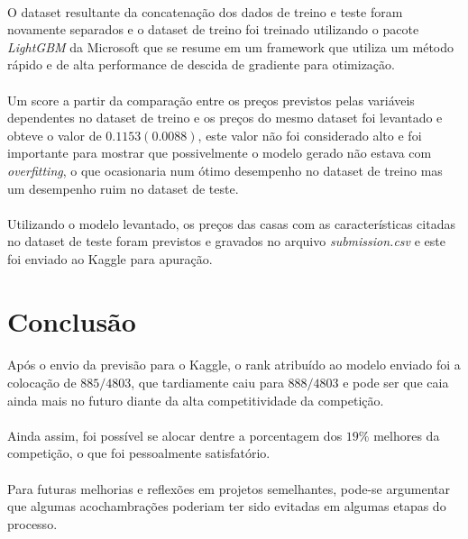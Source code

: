 \documentclass{article}
\begin{document}
	\paragraph{}O dataset resultante da concatenação dos dados de treino e teste foram novamente separados e o dataset de treino foi treinado utilizando o pacote \textit{LightGBM} da Microsoft que se resume em um framework que utiliza um método rápido e de alta performance de descida de gradiente para otimização.
	
	\paragraph{}Um score a partir da comparação entre os preços previstos pelas variáveis dependentes no dataset de treino e os preços do mesmo dataset foi levantado e obteve o valor de $0.1153 (0.0088)$, este valor não foi considerado alto e foi importante para mostrar que possivelmente o modelo gerado não estava com \textit{overfitting}, o que ocasionaria num ótimo desempenho no dataset de treino mas um desempenho ruim no dataset de teste.
	
	\paragraph{}Utilizando o modelo levantado, os preços das casas com as características citadas no dataset de teste foram previstos e gravados no arquivo \textit{submission.csv} e este foi enviado ao Kaggle para apuração.
\section{Conclusão}

	\paragraph{}Após o envio da previsão para o Kaggle, o rank atribuído ao modelo enviado foi a colocação de $885/4803$, que tardiamente caiu para $888/4803$ e pode ser que caia ainda mais no futuro diante da alta competitividade da competição.
	
	\paragraph{}Ainda assim, foi possível se alocar dentre a porcentagem dos $19\%$ melhores da competição, o que foi pessoalmente satisfatório.
	
	\paragraph{}Para futuras melhorias e reflexões em projetos semelhantes, pode-se argumentar que algumas acochambrações poderiam ter sido evitadas em algumas etapas do processo.
	
\end{document}
